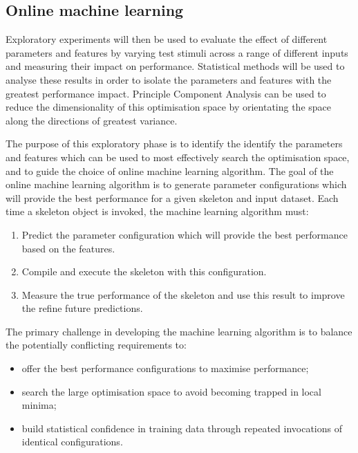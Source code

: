 \subsection{Online machine learning}
Exploratory experiments will then be used to evaluate the effect of
different parameters and features by varying test stimuli across a
range of different inputs and measuring their impact on
performance. Statistical methods will be used to analyse these results
in order to isolate the parameters and features with the greatest
performance impact. Principle Component Analysis can be used to reduce
the dimensionality of this optimisation space by orientating the space
along the directions of greatest variance.

The purpose of this exploratory phase is to identify the identify the
parameters and features which can be used to most effectively search
the optimisation space, and to guide the choice of online machine
learning algorithm. The goal of the online machine learning algorithm
is to generate parameter configurations which will provide the best
performance for a given skeleton and input dataset. Each time a
skeleton object is invoked, the machine learning algorithm must:

\begin{enumerate}
\item Predict the parameter configuration which will provide the best
  performance based on the features.
\item Compile and execute the skeleton with this configuration.
\item Measure the true performance of the skeleton and use this result
  to improve the refine future predictions.
\end{enumerate}

The primary challenge in developing the machine learning algorithm is
to balance the potentially conflicting requirements to:

\begin{itemize}
\item offer the best performance configurations to maximise
  performance;
\item search the large optimisation space to avoid becoming trapped in
  local minima;
\item build statistical confidence in training data through repeated
  invocations of identical configurations.
\end{itemize}

